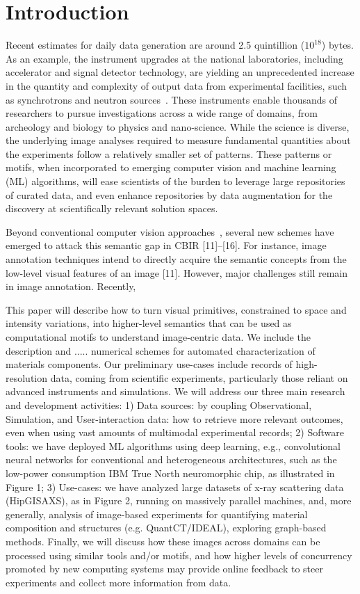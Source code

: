 \section{Introduction}
Recent estimates for daily data generation are around 2.5 quintillion ($10^{18}$) bytes. As an example, the instrument upgrades at the national laboratories, including accelerator and signal detector technology, are yielding an unprecedented increase in the quantity and complexity of output data from experimental facilities, such as synchrotrons and neutron sources~\cite{EOD:2015}. These instruments enable thousands of researchers to pursue investigations across a wide range of domains, from archeology and biology to physics and nano-science. While the science is diverse, the underlying image analyses required to measure fundamental quantities about the experiments follow a relatively smaller set of patterns. These patterns or motifs, when incorporated to emerging computer vision and machine learning (ML) algorithms, will ease scientists of the burden to leverage large repositories of curated data, and even enhance repositories by data augmentation for the discovery at scientifically relevant solution spaces.


Beyond conventional computer vision approaches~\cite{Ballard, Gonzalez}, several new schemes
have emerged to attack this semantic gap in CBIR [11]–[16].
For instance, image annotation techniques intend to directly
acquire the semantic concepts from the low-level visual
features of an image [11]. However, major challenges still
remain in image annotation. Recently,


This paper will describe how to turn visual primitives, constrained to space and intensity variations, into higher-level semantics that can be used as computational motifs to understand image-centric data. We include the description and .....
 numerical schemes for automated characterization of materials components. Our preliminary use-cases include records of high-resolution data, coming from scientific experiments, particularly those reliant on advanced instruments and simulations. We will address our three main research and development activities:
1) Data sources: by coupling Observational, Simulation, and User-interaction data: how to retrieve
more relevant outcomes, even when using vast amounts of multimodal experimental records;
2) Software tools: we have deployed ML algorithms using deep learning, e.g., convolutional neural
networks for conventional and heterogeneous architectures, such as the low-power consumption IBM True
North neuromorphic chip, as illustrated in Figure 1;
3) Use-cases: we have analyzed large datasets of x-ray scattering data (HipGISAXS), as in Figure 2, running on massively parallel machines, and, more generally, analysis of image-based experiments for quantifying material composition and structures (e.g. QuantCT/IDEAL), exploring graph-based methods. Finally, we will discuss how these images across domains can be processed using similar tools and/or motifs, and how higher levels of concurrency promoted by new computing systems may provide online feedback to steer experiments and collect more information from data.


